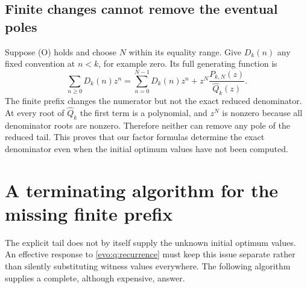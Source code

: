 \documentclass[11pt,a4paper]{article}
\numberwithin{equation}{section}
\theoremstyle{definition}
\theoremstyle{remark}
\begin{document}
\subsection{Finite changes cannot remove the eventual poles}
Suppose (O) holds and choose $N$ within its equality range. Give $D_k(n)$
any fixed convention at $n<k$, for example zero. Its full generating
function is
\begin{equation}\label{sc:eq:prefixGF}
 \sum_{n\ge0}D_k(n)z^n
 =\sum_{n=0}^{N-1}D_k(n)z^n
       +z^N\frac{P_{k,N}(z)}{\widehat Q_k(z)}.
\end{equation}
The finite prefix changes the numerator but not the exact reduced
denominator. At every root of $\widehat Q_k$ the first term is a
polynomial, and $z^N$ is nonzero because all denominator roots are
nonzero. Therefore neither can remove any pole of the reduced tail.
This proves that our factor formulas determine the exact denominator even
when the initial optimum values have not been computed.

\section{A terminating algorithm for the missing finite prefix}\label{sc:sec:prefix}

The explicit tail does not by itself supply the unknown initial optimum
values. An effective response to \cref{evo:q:recurrence} must keep this issue
separate rather than silently substituting witness values everywhere.
The following algorithm supplies a complete, although expensive, answer.
\end{document}

